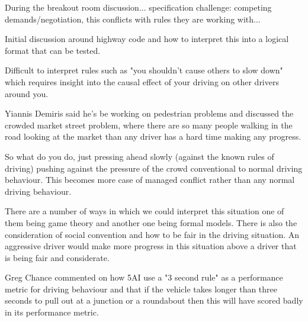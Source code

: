 \documentclass[sigconf]{acmart}
\begin{document}
During the breakout room discussion... specification challenge: competing demands/negotiation, this conflicts with rules they are working with...

Initial discussion around highway code and how to interpret this into a logical format that can be tested.

Difficult to interpret rules such as "you shouldn't cause others to slow down" which requires insight into the causal effect of your driving on other drivers around you.

Yiannis Demiris said he's be working on pedestrian problems and discussed the crowded market street problem, where there are so many people walking in the road looking at the market than any driver has a hard time making any progress.

So what do you do, just pressing ahead slowly (against the known rules of driving) pushing against the pressure of the crowd conventional to normal driving behaviour. This becomes more case of managed conflict rather than any normal driving behaviour. 

There are a number of ways in which we could interpret this situation one of them being game theory and another one being formal models. There is also the consideration of social convention and how to be fair in the driving situation. An aggressive driver would make more progress in this situation above a driver that is being fair and considerate.

Greg Chance commented on how 5AI use a "3 second rule" as a performance metric for driving behaviour and that if the vehicle takes longer than three seconds to pull out at a junction or a roundabout then this will have scored badly in its performance metric.

\end{document}
